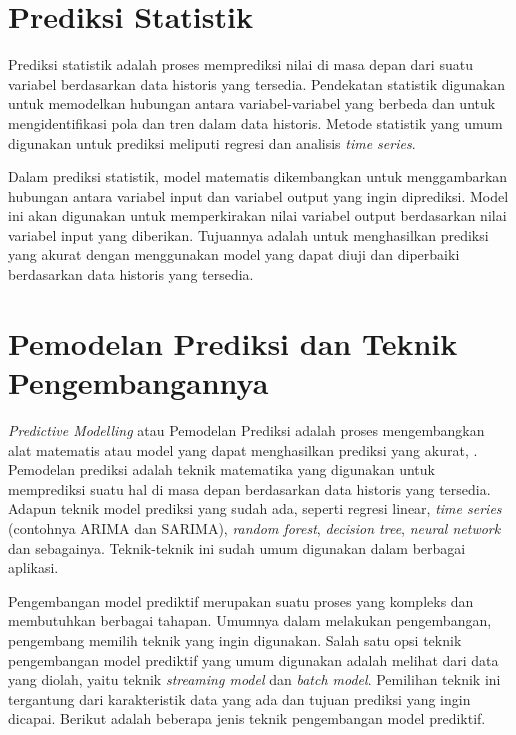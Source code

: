 \section{Prediksi Statistik}
Prediksi statistik adalah proses memprediksi nilai di masa depan dari suatu variabel berdasarkan data historis yang tersedia. Pendekatan statistik digunakan untuk memodelkan hubungan antara variabel-variabel yang berbeda dan untuk mengidentifikasi pola dan tren dalam data historis. Metode statistik yang umum digunakan untuk prediksi meliputi regresi dan analisis \textit{time series}.

Dalam prediksi statistik, model matematis dikembangkan untuk menggambarkan hubungan antara variabel input dan variabel output yang ingin diprediksi. Model ini akan digunakan untuk memperkirakan nilai variabel output berdasarkan nilai variabel input yang diberikan. Tujuannya adalah untuk menghasilkan prediksi yang akurat dengan menggunakan model yang dapat diuji dan diperbaiki berdasarkan data historis yang tersedia.

\section{Pemodelan Prediksi dan Teknik Pengembangannya}

\textit{Predictive Modelling} atau Pemodelan Prediksi adalah proses mengembangkan alat matematis atau model yang dapat menghasilkan prediksi yang akurat, \parencite{appliedpredictivemodel}. Pemodelan prediksi adalah teknik matematika yang digunakan untuk memprediksi suatu hal di masa depan berdasarkan data historis yang tersedia. 
Adapun teknik model prediksi yang sudah ada, seperti regresi linear, \textit{time series} (contohnya ARIMA dan SARIMA), \textit{random forest}, \textit{decision tree}, \textit{neural network} dan sebagainya. Teknik-teknik ini sudah umum digunakan dalam berbagai aplikasi.

Pengembangan model prediktif merupakan suatu proses yang kompleks dan membutuhkan berbagai tahapan. Umumnya dalam melakukan pengembangan, pengembang memilih teknik yang ingin digunakan. Salah satu opsi teknik pengembangan model prediktif yang umum digunakan adalah melihat dari data yang diolah, yaitu teknik \textit{streaming model} dan \textit{batch model}. Pemilihan teknik ini tergantung dari karakteristik data yang ada dan tujuan prediksi yang ingin dicapai. Berikut adalah beberapa jenis teknik pengembangan model prediktif.

